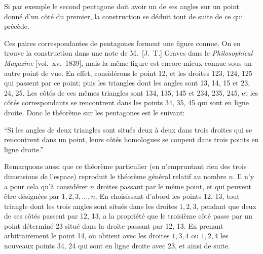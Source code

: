 \documentclass[12pt,a4paper]{article}
\begin{document}
Si par exemple le second pentagone doit avoir un de ses angles sur un point donn\'e d'un c\^ot\'e du premier, la construction se d\'eduit tout de suite de ce qui pr\'ec\`ede.

Ces paires correspondantes de pentagones forment une figure connue. On en trouve la construction dans une note de M.~[J.~T.] Graves dans le \emph{Philosophical Magazine} [vol.~xv.~1839], mais la m\^eme figure est encore mieux connue sous un autre point de vue. En effet, consid\'erons le point 12, et les droites 123, 124, 125 qui passent par ce point; puis les triangles dont les angles sont 13, 14, 15 et 23, 24, 25. Les c\^ot\'es de ces m\^emes triangles sont 134, 135, 145 et 234, 235, 245, et les c\^ot\'es correspondants se rencontrent dans les points 34, 35, 45 qui sont en ligne droite. Donc le th\'eor\`eme sur les pentagones est le suivant:

``Si les angles de deux triangles sont situ\'es deux \`a deux dans trois droites qui se rencontrent dans un point, leurs c\^ot\'es homologues se coupent dans trois points en ligne droite.''

Remarquons aussi que ce th\'eor\`eme particulier (en n'empruntant rien des trois dimensions de l'espace) reproduit le th\'eor\`eme g\'en\'eral relatif au nombre $n$. Il n'y a pour cela qu'\`a consid\'erer $n$ droites passant par le m\^eme point, et qui peuvent \^etre d\'esign\'ees par $1, 2, 3, \ldots, n$. En choisissant d'abord les points 12, 13, tout triangle dont les trois angles sont situ\'es dans les droites $1, 2, 3$, pendant que deux de ses c\^ot\'es passent par 12, 13, a la propri\'et\'e que le troisi\`eme c\^ot\'e passe par un point d\'etermin\'e 23 situ\'e dans la droite passant par 12, 13. En prenant arbitrairement le point 14, on obtient avec les droites $1, 3, 4$ ou $1, 2, 4$ les nouveaux points 34, 24 qui sont en ligne droite avec 23, et ainsi de suite.
\end{document}
